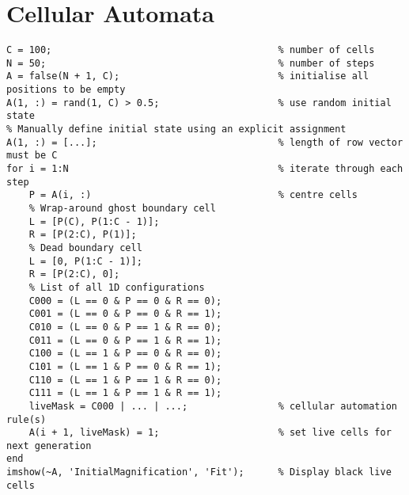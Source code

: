 \documentclass{article}
\begin{document}
\section*{Cellular Automata}
\begin{lstlisting}
C = 100;                                        % number of cells
N = 50;                                         % number of steps
A = false(N + 1, C);                            % initialise all positions to be empty
A(1, :) = rand(1, C) > 0.5;                     % use random initial state
% Manually define initial state using an explicit assignment
A(1, :) = [...];                                % length of row vector must be C
for i = 1:N                                     % iterate through each step
    P = A(i, :)                                 % centre cells
    % Wrap-around ghost boundary cell 
    L = [P(C), P(1:C - 1)];
    R = [P(2:C), P(1)];
    % Dead boundary cell
    L = [0, P(1:C - 1)];
    R = [P(2:C), 0];
    % List of all 1D configurations
    C000 = (L == 0 & P == 0 & R == 0);
    C001 = (L == 0 & P == 0 & R == 1);
    C010 = (L == 0 & P == 1 & R == 0);
    C011 = (L == 0 & P == 1 & R == 1);
    C100 = (L == 1 & P == 0 & R == 0);
    C101 = (L == 1 & P == 0 & R == 1);
    C110 = (L == 1 & P == 1 & R == 0);
    C111 = (L == 1 & P == 1 & R == 1);
    liveMask = C000 | ... | ...;                % cellular automation rule(s)
    A(i + 1, liveMask) = 1;                     % set live cells for next generation
end
imshow(~A, 'InitialMagnification', 'Fit');      % Display black live cells
\end{lstlisting}
\end{document}

